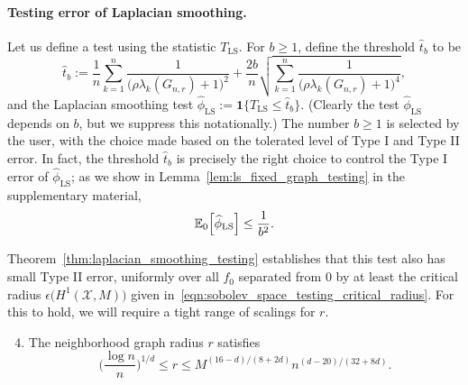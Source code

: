 \documentclass{article}
\newcommand{\1}{\mathbf{1}}
\newcommand{\Xset}{\mathcal{X}}
\newcommand{\Ebb}{\mathbb{E}}
\newcommand{\wh}[1]{\widehat{#1}}
\newcommand{\LS}{\mathrm{LS}}
\theoremstyle{alden}
\theoremstyle{aldenthm}
\theoremstyle{definition}
\theoremstyle{remark}
\begin{document}
\paragraph{Testing error of Laplacian smoothing.}
Let us define a test using the statistic $T_{\LS}$. For $b \geq 1$, define the threshold $\wh{t}_b$ to be
\begin{equation*}
\wh{t}_{b} := \frac{1}{n}\sum_{k = 1}^{n} \frac{1}{\bigl(\rho \lambda_k(G_{n,r}) + 1\bigr)^2} + \frac{2b}{n}\sqrt{\sum_{k = 1}^{n} \frac{1}{\bigl(\rho \lambda_k(G_{n,r}) + 1\bigr)^4}},
\end{equation*}
and the Laplacian smoothing test $\wh{\phi}_{\LS} := \1\bigl\{T_{\LS} \leq \wh{t}_b\bigr\}$. (Clearly the test $\wh{\phi}_{\LS}$ depends on $b$, but we suppress this notationally.) The number $b \geq 1$ is selected by the user, with the choice made based on the tolerated level of Type I and Type II error. In fact, the threshold $\wh{t}_b$ is precisely the right choice to control the Type I error of $\wh{\phi}_{\LS}$; as we show in Lemma~\ref{lem:ls_fixed_graph_testing} in the supplementary material,
\begin{equation*}
\Ebb_0\Bigl[\wh{\phi}_{\LS}\Bigr] \leq \frac{1}{b^2}.
\end{equation*}

Theorem~\ref{thm:laplacian_smoothing_testing} establishes that this test also has small Type II error, uniformly over all $f_0$ separated from $0$ by at least the critical radius $\epsilon\bigl(H^1(\Xset,M)\bigr)$ given in~\eqref{eqn:sobolev_space_testing_critical_radius}. For this to hold, we will require a tight range of scalings for $r$.
\begin{enumerate}[label=(R\arabic*)]
	\setcounter{enumi}{3}
	\item 
	\label{asmp:ls_kernel_radius_testing}
	The neighborhood graph radius $r$ satisfies
	\begin{equation*}
	\biggl(\frac{\log n}{n}\biggr)^{1/d} \leq r \leq M^{(16 - d)/(8 + 2d)}n^{(d - 20)/(32 + 8d)}.
	\end{equation*}
\end{enumerate}
\end{document}
